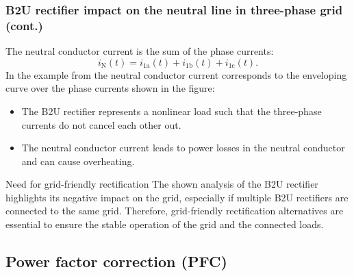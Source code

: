 \begin{frame}
    \frametitle{B2U rectifier impact on the neutral line in three-phase grid (cont.)}
    The neutral conductor current is the sum of the phase currents:
    \begin{equation}
        i_{\mathrm{N}}(t) = i_{1\mathrm{a}}(t) + i_{1\mathrm{b}}(t) + i_{1\mathrm{c}}(t).
    \end{equation}\pause
    In the example from  the neutral conductor current corresponds to the enveloping curve over the phase currents shown in the figure:
    \begin{itemize}
        \item The B2U rectifier represents a nonlinear load such that the three-phase currents do not cancel each other out.\pause
        \item The neutral conductor current leads to power losses in the neutral conductor and can cause overheating.\pause
    \end{itemize}
    \vspace{-0.5cm}
    \begin{varblock}{Need for grid-friendly rectification}
        The shown analysis of the B2U rectifier highlights its negative impact on the grid, especially if multiple B2U rectifiers are connected to the same grid. Therefore, grid-friendly rectification alternatives are essential to ensure the stable operation of the grid and the connected loads.
    \end{varblock}
\end{frame}

\subsection{Power factor correction (PFC)} 

